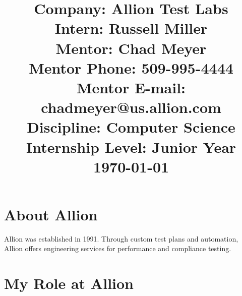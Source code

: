 \documentclass{article}
\title{Company: Allion Test Labs\\
Intern: Russell Miller\\
Mentor: Chad Meyer\\
Mentor Phone: 509-995-4444\\
Mentor E-mail: chadmeyer@us.allion.com\\
Discipline: Computer Science\\
Internship Level: Junior Year\\
\today}
\date{}
\begin{document}
\maketitle

\pagebreak

\section*{About Allion}
Allion was established in 1991. Through custom test plans and automation, Allion
offers engineering services for performance and compliance testing. 

\section*{My Role at Allion}
\end{document}
